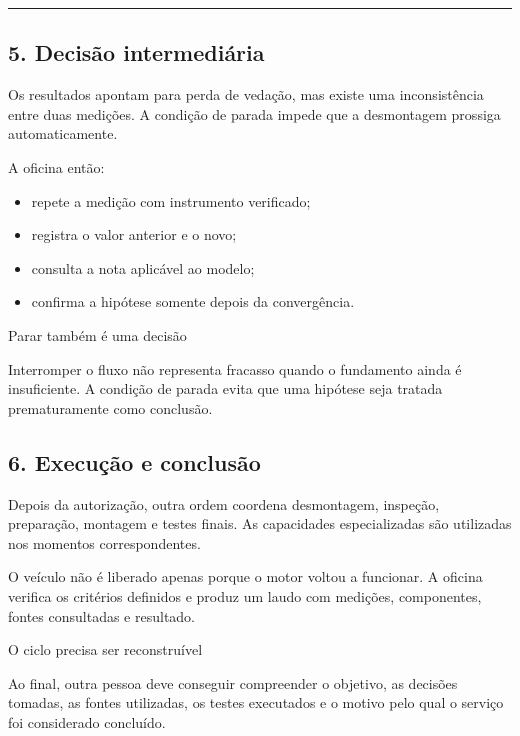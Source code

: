 \documentclass[
  10pt,
  a4paper,
  oneside]{book}
\providecommand{\tightlist}{%
  \setlength{\itemsep}{0pt}\setlength{\parskip}{0pt}}
\begin{document}
\begin{center}\rule{0.5\linewidth}{0.5pt}\end{center}

\hypertarget{decisuxe3o-intermediuxe1ria}{%
\subsection{5. Decisão
intermediária}\label{decisuxe3o-intermediuxe1ria}}

Os resultados apontam para perda de vedação, mas existe uma
inconsistência entre duas medições. A condição de parada impede que a
desmontagem prossiga automaticamente.

A oficina então:

\begin{itemize}
\tightlist
\item
  repete a medição com instrumento verificado;
\item
  registra o valor anterior e o novo;
\item
  consulta a nota aplicável ao modelo;
\item
  confirma a hipótese somente depois da convergência.
\end{itemize}

\begin{tipbox}{Parar também é uma decisão}

Interromper o fluxo não representa fracasso quando o fundamento ainda é
insuficiente. A condição de parada evita que uma hipótese seja tratada
prematuramente como conclusão.

\end{tipbox}

\hypertarget{execuuxe7uxe3o-e-conclusuxe3o}{%
\subsection{6. Execução e
conclusão}\label{execuuxe7uxe3o-e-conclusuxe3o}}

Depois da autorização, outra ordem coordena desmontagem, inspeção,
preparação, montagem e testes finais. As capacidades especializadas são
utilizadas nos momentos correspondentes.

O veículo não é liberado apenas porque o motor voltou a funcionar. A
oficina verifica os critérios definidos e produz um laudo com medições,
componentes, fontes consultadas e resultado.

\begin{evidencebox}{O ciclo precisa ser reconstruível}

Ao final, outra pessoa deve conseguir compreender o objetivo, as
decisões tomadas, as fontes utilizadas, os testes executados e o motivo
pelo qual o serviço foi considerado concluído.

\end{evidencebox}
\end{document}
